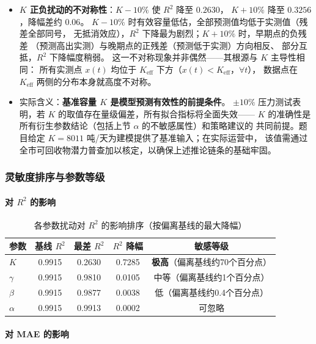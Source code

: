 \documentclass[12pt,a4paper]{ctexart}
\begin{document}
\begin{table}[htbp]
\begin{itemize}
  \item \textbf{$K$ 正负扰动的不对称性}：$K -10\%$ 使 $R^2$ 降至 $0.2630$，
        $K +10\%$ 降至 $0.3256$，降幅差约 $0.06$。
        $K -10\%$ 时有效容量低估，全部预测值均低于实测值（残差全部同号，
        无抵消效应），$R^2$ 下降最为剧烈；$K +10\%$ 时，早期点的负残差
        （预测高出实测）与晚期点的正残差（预测低于实测）方向相反、
        部分互抵，$R^2$ 下降幅度稍弱。
        这一不对称现象并非偶然——其根源与 $K$ 主导性相同：
        所有实测点 $x(t)$ 均位于 $K_{\text{eff}}$ 下方（$x(t) < K_{\text{eff}}$，$\forall t$），
        数据点在 $K_{\text{eff}}$ 两侧的分布本身就高度不对称。
  \item 实际含义：\textbf{基准容量 $K$ 是模型预测有效性的前提条件}。
        $\pm 10\%$ 压力测试表明，若 $K$ 的取值存在量级偏差，所有拟合指标将全面失效——
        $K$ 的准确性是所有衍生参数结论（包括上节 $\alpha$ 的不敏感属性）和策略建议的
        共同前提。题目给定 $K = 8011$ 吨/天为建模提供了基准输入；在实际运营中，
        该值需通过全市可回收物潜力普查加以核定，以确保上述推论链条的基础牢固。
\end{itemize}

\subsubsection{灵敏度排序与参数等级}

\paragraph{对 $R^2$ 的影响}

\begin{table}[htbp]
\centering
\caption{各参数扰动对 $R^2$ 的影响排序（按偏离基线的最大降幅）}
\label{tab:sensitivity_r2}
\begin{tabular}{lcccc}
\toprule
参数 & 基线 $R^2$ & 最差 $R^2$ & $R^2$ 降幅 & 敏感等级 \\
\midrule
$K$      & 0.9915 & 0.2630 & 0.7285 & \textbf{极高}（偏离基线约70个百分点）\\
$\gamma$ & 0.9915 & 0.9810 & 0.0105 & 中等（偏离基线约1个百分点）\\
$\beta$  & 0.9915 & 0.9877 & 0.0038 & 低（偏离基线约0.4个百分点）\\
$\alpha$ & 0.9915 & 0.9913 & 0.0002 & 可忽略 \\
\bottomrule
\end{tabular}
\end{table}

\paragraph{对 MAE 的影响}


\end{table}
\end{document}

